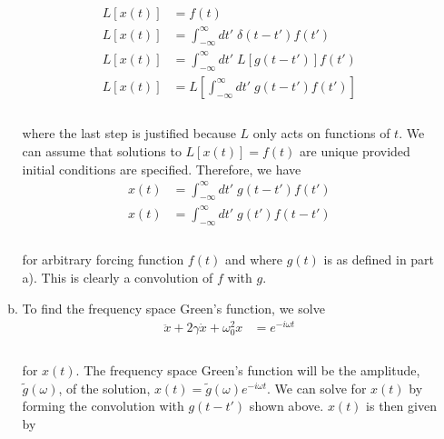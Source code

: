 \documentclass[]{article}
\begin{document}
\begin{enumerate}[1)]
\begin{enumerate}[a)]
\begin{equation}
\begin{aligned}
L\left[ x(t) \right] & =  f(t) \\
L\left[ x(t) \right] & =  \int_{-\infty}^{\infty} dt' \; \delta(t - t') f(t') \\
L\left[ x(t) \right] & =  \int_{-\infty}^{\infty} dt' \; L\left[ g(t - t') \right]  f(t') \\
L\left[ x(t) \right] & = L\left[ \int_{-\infty}^{\infty} dt' \; g(t - t')   f(t') \right]\\
\end{aligned}
\end{equation} \\

where the last step is justified because $L$ only acts on functions of $t$. We can assume that solutions to $L\left[ x(t) \right] =  f(t)$ are unique provided initial conditions are specified. Therefore, we have \\

\begin{equation}
\begin{aligned}
 x(t) & = \int_{-\infty}^{\infty} dt' \; g(t - t')   f(t') \\
 x(t) & = \int_{-\infty}^{\infty} dt' \; g(t')   f(t - t') \\
\end{aligned}
\end{equation} \\

for arbitrary forcing function $f(t)$ and where $g(t)$ is as defined in part a). This is clearly a convolution of $f$ with $g$. \\

\item To find the frequency space Green's function, we solve \\

\begin{equation}
\begin{aligned}
\ddot{x} + 2 \gamma \dot{x} + \omega_0^2 x & = e^{- i \omega t} \\
\end{aligned}
\end{equation} \\

for $x(t)$. The frequency space Green's function will be the amplitude, $\tilde{g}(\omega)$, of the solution, $x(t) = \tilde{g}(\omega) e^{- i \omega t}$. We can solve for $x(t)$ by forming the convolution with $g(t - t')$ shown above. $x(t)$ is then given by \\


\end{enumerate}
\end{enumerate}
\end{document}
